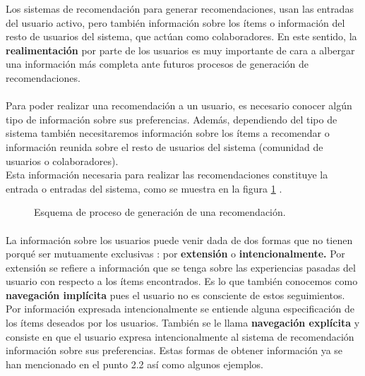 \documentclass[12pt,letterpaper,oneside] {memoir}
\begin{document}
Los sistemas de recomendación para generar recomendaciones, usan las entradas del usuario activo, pero también información sobre los ítems o información del resto de usuarios del sistema, que actúan como colaboradores. En este sentido, la \textbf{realimentación} por parte de los usuarios es muy importante de cara a albergar una información más completa ante futuros procesos de generación de recomendaciones. 
\paragraph*{}
Para poder realizar una recomendación a un usuario, es necesario conocer algún tipo de información sobre sus preferencias. Además, dependiendo del tipo de sistema también necesitaremos información sobre los ítems a recomendar o información reunida sobre el resto de usuarios del sistema (comunidad de usuarios o colaboradores). \\
Esta información necesaria para realizar las recomendaciones constituye la entrada o entradas del sistema, como se muestra en la figura \ref{fig:procesoRecomendacion} \citep{Porcel2004}.\\

\begin{figure}[H] 
 \centering 
{} \caption{Esquema de proceso de generación de una recomendación.} 
 \label{fig:procesoRecomendacion} 
\end{figure}

\paragraph{}
La información sobre los usuarios puede venir dada de dos formas que no tienen porqué ser mutuamente exclusivas \citep{Yager2003}: por \textbf{extensión} o \textbf{intencionalmente.} Por extensión se refiere a información que se tenga sobre las experiencias pasadas del usuario con respecto a los ítems encontrados. Es lo que también conocemos como \textbf{navegación implícita} pues el usuario no es consciente de estos seguimientos. Por información expresada intencionalmente se entiende alguna especificación de los ítems deseados por los usuarios. También se le llama \textbf{navegación explícita} y consiste en que el usuario expresa intencionalmente al sistema de recomendación información sobre sus preferencias.
Estas formas de obtener información ya se han mencionado en el punto 2.2 así como algunos ejemplos.
\end{document}

